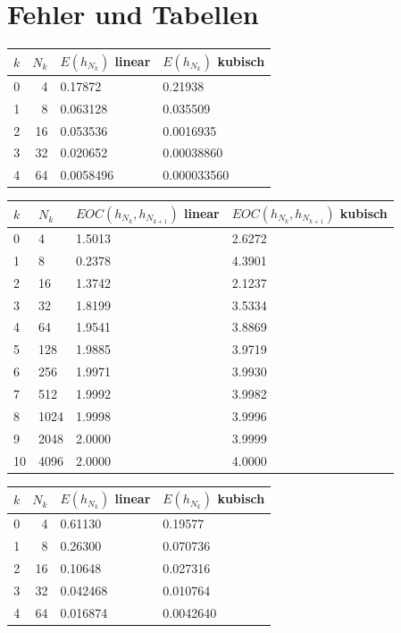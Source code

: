 \documentclass[a4paper, 11pt, ngerman]{scrartcl}
\begin{document}
\section{Fehler und Tabellen}
\begin{center}
	\begin{tabular}{cr|l|l}
		\hline
		$k$ & $N_k$ & $E(h_{N_k})$ linear & $E(h_{N_k})$ kubisch \\
		\hline
		0 & 4 & 0.17872 & 0.21938 \\
		\hline
		1 & 8 & 0.063128 & 0.035509 \\
		\hline 
		2 & 16 & 0.053536  & 0.0016935\\
		\hline 
		3 & 32 & 0.020652  & 0.00038860\\
		\hline 
		4 & 64 & 0.0058496 & 0.000033560\\
		\hline
	\end{tabular}

	\begin{tabular}{ll|l|l}
		\hline
		$k$ & $N_k$ & $EOC(h_{N_k},h_{N_{k+1}})$ linear & $EOC(h_{N_k},h_{N_{k+1}})$ kubisch\\
		\hline
		0 & 4 & 1.5013 & 2.6272\\
		\hline
		1 & 8 & 0.2378 & 4.3901\\
		\hline
		2 & 16 & 1.3742 & 2.1237\\
		\hline
		3 & 32 & 1.8199 & 3.5334\\
		\hline
		4 & 64 & 1.9541 & 3.8869\\
		\hline
		5 & 128 & 1.9885 & 3.9719\\
		\hline
		6 & 256 & 1.9971 & 3.9930\\
		\hline
		7 & 512 & 1.9992 & 3.9982\\
		\hline
		8 & 1024 & 1.9998 & 3.9996\\
		\hline
		9 & 2048 & 2.0000 & 3.9999\\
		\hline
		10 & 4096 & 2.0000 & 4.0000\\
		\hline
	\end{tabular}

	\begin{tabular}{cr|l|l}
		\hline
		$k$ & $N_k$ & $E(h_{N_k})$ linear & $E(h_{N_k})$ kubisch\\
		\hline
		0 & 4 & 0.61130 & 0.19577 \\
		\hline
		1 & 8 & 0.26300 & 0.070736 \\
		\hline 
		2 & 16 & 0.10648 & 0.027316 \\
		\hline 
		3 & 32 & 0.042468 & 0.010764 \\
		\hline 
		4 & 64 & 0.016874 & 0.0042640 \\
		\hline
	\end{tabular}


\end{center}
\end{document}
